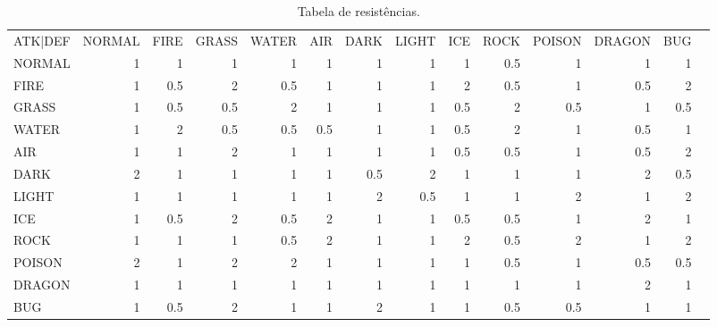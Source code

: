 \begin{table}[!htp]\centering
\caption{Tabela de resistências.}\label{resistance}
\scriptsize
\begin{tabular}{lrrrrrrrrrrrrr}\toprule
ATK|DEF &NORMAL &FIRE &GRASS &WATER &AIR &DARK &LIGHT &ICE &ROCK &POISON &DRAGON &BUG \\\cmidrule{1-13}
NORMAL &1 &1 &1 &1 &1 &1 &1 &1 &\cellcolor[HTML]{e06666}0.5 &1 &1 &1 \\\cmidrule{1-13}
FIRE &1 &\cellcolor[HTML]{e06666}0.5 &\cellcolor[HTML]{00ff00}2 &\cellcolor[HTML]{e06666}0.5 &1 &1 &1 &\cellcolor[HTML]{00ff00}2 &\cellcolor[HTML]{e06666}0.5 &1 &\cellcolor[HTML]{e06666}0.5 &\cellcolor[HTML]{00ff00}2 \\\cmidrule{1-13}
GRASS &1 &\cellcolor[HTML]{e06666}0.5 &\cellcolor[HTML]{e06666}0.5 &\cellcolor[HTML]{00ff00}2 &1 &1 &1 &\cellcolor[HTML]{e06666}0.5 &\cellcolor[HTML]{00ff00}2 &\cellcolor[HTML]{e06666}0.5 &1 &\cellcolor[HTML]{e06666}0.5 \\\cmidrule{1-13}
WATER &1 &\cellcolor[HTML]{00ff00}2 &\cellcolor[HTML]{e06666}0.5 &\cellcolor[HTML]{e06666}0.5 &\cellcolor[HTML]{e06666}0.5 &1 &1 &\cellcolor[HTML]{e06666}0.5 &\cellcolor[HTML]{00ff00}2 &1 &\cellcolor[HTML]{e06666}0.5 &1 \\\cmidrule{1-13}
AIR &1 &1 &\cellcolor[HTML]{00ff00}2 &1 &1 &1 &1 &\cellcolor[HTML]{e06666}0.5 &\cellcolor[HTML]{e06666}0.5 &1 &\cellcolor[HTML]{e06666}0.5 &\cellcolor[HTML]{00ff00}2 \\\cmidrule{1-13}
DARK &\cellcolor[HTML]{00ff00}2 &1 &1 &1 &1 &\cellcolor[HTML]{e06666}0.5 &\cellcolor[HTML]{00ff00}2 &1 &1 &1 &\cellcolor[HTML]{00ff00}2 &\cellcolor[HTML]{e06666}0.5 \\\cmidrule{1-13}
LIGHT &1 &1 &1 &1 &1 &\cellcolor[HTML]{00ff00}2 &\cellcolor[HTML]{e06666}0.5 &1 &1 &\cellcolor[HTML]{00ff00}2 &1 &\cellcolor[HTML]{00ff00}2 \\\cmidrule{1-13}
ICE &1 &\cellcolor[HTML]{e06666}0.5 &\cellcolor[HTML]{00ff00}2 &\cellcolor[HTML]{e06666}0.5 &\cellcolor[HTML]{00ff00}2 &1 &1 &\cellcolor[HTML]{e06666}0.5 &\cellcolor[HTML]{e06666}0.5 &1 &\cellcolor[HTML]{00ff00}2 &1 \\\cmidrule{1-13}
ROCK &1 &1 &1 &\cellcolor[HTML]{e06666}0.5 &\cellcolor[HTML]{00ff00}2 &1 &1 &\cellcolor[HTML]{00ff00}2 &\cellcolor[HTML]{e06666}0.5 &\cellcolor[HTML]{00ff00}2 &1 &\cellcolor[HTML]{00ff00}2 \\\cmidrule{1-13}
POISON &\cellcolor[HTML]{00ff00}2 &1 &\cellcolor[HTML]{00ff00}2 &\cellcolor[HTML]{00ff00}2 &1 &1 &1 &1 &\cellcolor[HTML]{e06666}0.5 &1 &\cellcolor[HTML]{e06666}0.5 &\cellcolor[HTML]{e06666}0.5 \\\cmidrule{1-13}
DRAGON &1 &1 &1 &1 &1 &1 &1 &1 &1 &1 &\cellcolor[HTML]{00ff00}2 &1 \\\cmidrule{1-13}
BUG &1 &\cellcolor[HTML]{e06666}0.5 &\cellcolor[HTML]{00ff00}2 &1 &1 &\cellcolor[HTML]{00ff00}2 &1 &1 &\cellcolor[HTML]{e06666}0.5 &\cellcolor[HTML]{e06666}0.5 &1 &1 \\\midrule
\bottomrule
\end{tabular}
\end{table}

